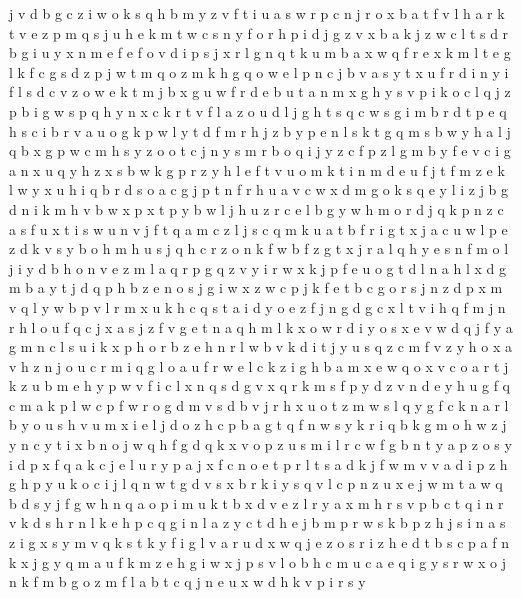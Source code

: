 \documentclass{article}
\begin{document}
j v d b g c z i w o k s q
h b m y z v f t i u a s w r p c n
j r o x b a t f v l h
a r k t v e z p m q s
j u h
e k m t w c s n y f o r h p i d j g z v x b a
k j z w c l t s d r b g i u y x n m e f
e f o v d i p s j x r l g n q t k u m b a
x w q f r e
x k m l t e g
l k f c g s d z p j w t m q o
z m k h g q o w e l p n c j b v a s y t x u f r d i
n y i f l s d c v z o w e k t m j b x g u
w f r d e b u t a n m x g h y s v p i k o c l q j z
p
b i g w s p q h y n x c k r t v f l a z o u d
l j g h t s
q c w s g i m b r d t p e
q h s c i b r v a u o g k p w l y t d f m
r h j z b y p e n l s k t g q m
s b w y h
a l j q b x g p w c m h s y z o
o t c j n y s m r b
o q i j y z c f p
z l
g
m b y f e v c i g a n x
u q y h z
x s b w k g p r z y h l e f t v u o m
k t i n m d e u f j
t f m z e k l w y x u h i q b r d s o a c g j
p t n f r h u a v c w x d m g o k s q e y l i z j b
g d n i k m h v b w x p
x t p y b w l j h u z r c
e l b g y w h m o r d j q k p n z c a s f u x t
i s w u n v j f t q a m c
z l j s c q m k u a t b
f r i g t x j a c u w l p e z d k v s y b o h m
h u s
j q h c r z o n k f w b
f z
g t x j r a l q h y e s
n f m o l j i
y d b h o n v e z m l a q r p g
q z v y i r w x k j p f e u o g t d l n a h
l x d g m b a y t j
d q p h b z e n o s j g i w x
z w c p j
k f e t b c g o r s j n z d p x m v q l y
w b p v l r m x u k h c q s t a i d y o e z f j n g
d g c x l t v i h q f m j
n r h l o u f q c j x a
s j z f v g e t n a q h m l k x o w r d i y
o
s x e
v w d q j f y a g m n c l s u i k x p h o r b z e
h n r l w b v k d i t j y u s q z c m f
v z y h o x
a v h z n j o u c r m i q g l
o a
u f r w e l c k z i g h b a m x
e w q o x v c
o a r t j k z u b m e h y p w v f i c l x n q s d g
v x q r k m s f p y d
z v n d e y h u g f q c m a k p l w
c p f w r o g d m v s
d b v j r h x u o t z m w s l q y g f c k n a
r l b y o u s h v
u m x i e l j d o z h c p b a g t q f n w s y k r
i q b k g m o h w z j y n
c y t i x
b n o j w q h f g
d q k x v o p z u s m i l r c w f g b n t y a
p
z o s y i d p x f q a k c j e l u r
y p a j x f c n o e t
p r l t s a d k j f w m v
v a d i p z h g
h p y u k o c i j l q n w t g d v s x
b r k i y s q v l c p n z u x e j w m t a
w q b d
s y j f g w h n q a o p i m u k t b x d v e z l r
y a x m h r s v p b c t q i n
r v k d s h
r n l
k e h p c q g i n
l a z y c t d h e j b m p r w s k
b p z h j s i
n a s z
i g x s y m
v q k s t
k y f i g l v a r u d x w q j e z o s
r i z h e d t b s c p a f n k x j g y q m
a u f k m z e h g i w x j p s v l o b
h c m u
c a e q i g y s r w x o j n k f m b
g o z m f l a b t c q j n e u x w d h k v p i r s y
\end{document}
